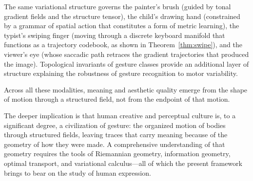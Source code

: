 \documentclass[12pt,a4paper]{article}
\theoremstyle{plain}
\theoremstyle{definition}
\begin{document}
The same variational structure governs the painter's brush (guided by tonal
gradient fields and the structure tensor), the child's drawing hand (constrained
by a grammar of spatial action that constitutes a form of metric learning),
the typist's swiping finger (moving through a discrete keyboard manifold that
functions as a trajectory codebook, as shown in Theorem~\ref{thm:swipe}), and
the viewer's eye (whose saccadic path retraces the gradient trajectories that
produced the image). Topological invariants of gesture classes provide an
additional layer of structure explaining the robustness of gesture recognition
to motor variability.

Across all these modalities, meaning and aesthetic quality emerge from the shape
of motion through a structured field, not from the endpoint of that motion.

The deeper implication is that human creative and perceptual culture is, to a
significant degree, a civilization of gesture: the organized motion of bodies
through structured fields, leaving traces that carry meaning because of the
geometry of how they were made. A comprehensive understanding of that geometry
requires the tools of Riemannian geometry, information geometry, optimal
transport, and variational calculus---all of which the present framework brings
to bear on the study of human expression.
\end{document}
